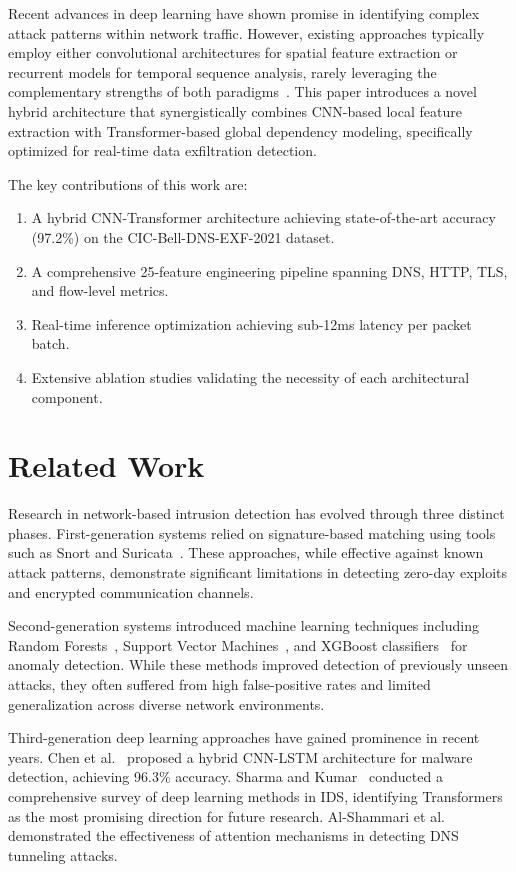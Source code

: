 \documentclass[conference]{IEEEtran}
\begin{document}
Recent advances in deep learning have shown promise in identifying complex attack patterns within network traffic. However, existing approaches typically employ either convolutional architectures for spatial feature extraction or recurrent models for temporal sequence analysis, rarely leveraging the complementary strengths of both paradigms~\cite{alshammari2021detection}. This paper introduces a novel hybrid architecture that synergistically combines CNN-based local feature extraction with Transformer-based global dependency modeling, specifically optimized for real-time data exfiltration detection.

The key contributions of this work are:
\begin{enumerate}
\item A hybrid CNN-Transformer architecture achieving state-of-the-art accuracy (97.2\%) on the CIC-Bell-DNS-EXF-2021 dataset.
\item A comprehensive 25-feature engineering pipeline spanning DNS, HTTP, TLS, and flow-level metrics.
\item Real-time inference optimization achieving sub-12ms latency per packet batch.
\item Extensive ablation studies validating the necessity of each architectural component.
\end{enumerate}

\section{Related Work}
\label{sec:related}

Research in network-based intrusion detection has evolved through three distinct phases. First-generation systems relied on signature-based matching using tools such as Snort and Suricata~\cite{miller2022enterprise}. These approaches, while effective against known attack patterns, demonstrate significant limitations in detecting zero-day exploits and encrypted communication channels.

Second-generation systems introduced machine learning techniques including Random Forests~\cite{chen2023hybrid}, Support Vector Machines~\cite{patel2023behavioral}, and XGBoost classifiers~\cite{gupta2024classification} for anomaly detection. While these methods improved detection of previously unseen attacks, they often suffered from high false-positive rates and limited generalization across diverse network environments.

Third-generation deep learning approaches have gained prominence in recent years. Chen et al.~\cite{chen2023hybrid} proposed a hybrid CNN-LSTM architecture for malware detection, achieving 96.3\% accuracy. Sharma and Kumar~\cite{sharma2023survey} conducted a comprehensive survey of deep learning methods in IDS, identifying Transformers as the most promising direction for future research. Al-Shammari et al.~\cite{alshammari2021detection} demonstrated the effectiveness of attention mechanisms in detecting DNS tunneling attacks.
\end{document}
